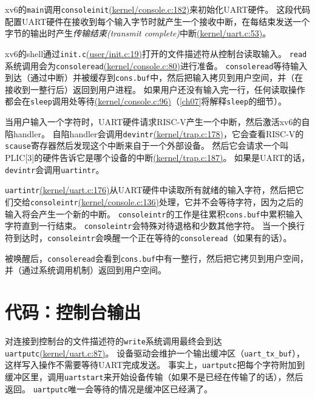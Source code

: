 xv6的\texttt{main}调用\texttt{consoleinit}\href{https://github.com/mit-pdos/xv6-riscv/blob/risc/kernel/console.c#L182}{(kernel/console.c:182)}来初始化UART硬件。
这段代码配置UART硬件在接收到每个输入字节时就产生一个接收中断，在每结束发送一个字节的输出时产生\emph{传输结束(transmit complete)}中断\href{https://github.com/mit-pdos/xv6-riscv/blob/risc/kernel/uart.c#L53}{(kernel/uart.c:53)}。

xv6的shell通过\texttt{init.c}\href{https://github.com/mit-pdos/xv6-riscv/blob/risc/user/init.c#L19}{(user/init.c:19)}打开的文件描述符从控制台读取输入。
\texttt{read}系统调用会为\texttt{consoleread}\href{https://github.com/mit-pdos/xv6-riscv/blob/risc/kernel/console.c#L80}{(kernel/console.c:80)}进行准备。
\texttt{consoleread}等待输入到达（通过中断）并被缓存到\texttt{cons.buf}中，然后把输入拷贝到用户空间，并（在接收到一整行后）返回到用户进程。
如果用户还没有输入完一行，任何读取操作都会在\texttt{sleep}调用处等待\href{https://github.com/mit-pdos/xv6-riscv/blob/risc/kernel/console.c#L96}{(kernel/console.c:96)}（\autoref{ch07}将解释\texttt{sleep}的细节）。

当用户输入一个字符时，UART硬件请求RISC-V产生一个中断，然后激活xv6的自陷handler。
自陷handler会调用\texttt{devintr}\href{https://github.com/mit-pdos/xv6-riscv/blob/risc/kernel/trap.c#L178}{(kernel/trap.c:178)}，它会查看RISC-V的\texttt{scause}寄存器然后发现这个中断来自于一个外部设备。
然后它会请求一个叫PLIC[3]的硬件告诉它是哪个设备的中断\href{https://github.com/mit-pdos/xv6-riscv/blob/risc/kernel/trap.c#L187}{(kernel/trap.c:187)}。
如果是UART的话，\texttt{devintr}会调用\texttt{uartintr}。

\texttt{uartintr}\href{https://github.com/mit-pdos/xv6-riscv/blob/risc/kernel/uart.c#L176}{(kernel/uart.c:176)}从UART硬件中读取所有就绪的输入字符，然后把它们交给\texttt{consoleintr}\href{https://github.com/mit-pdos/xv6-riscv/blob/risc/kernel/console.c#L136}{(kernel/console.c:136)}处理，它并不会等待字符，因为之后的输入将会产生一个新的中断。
\texttt{consoleintr}的工作是往累积\texttt{cons.buf}中累积输入字符直到一行结束。
\texttt{consoleintr}会特殊对待退格和少数其他字符。
当一个换行符到达时，\texttt{consoleintr}会唤醒一个正在等待的\texttt{consoleread}（如果有的话）。

被唤醒后，\texttt{consoleread}会看到\texttt{cons.buf}中有一整行，然后把它拷贝到用户空间，并（通过系统调用机制）返回到用户空间。

\section{代码：控制台输出}
对连接到控制台的文件描述符的\texttt{write}系统调用最终会到达\texttt{uartputc}\href{https://github.com/mit-pdos/xv6-riscv/blob/riscv//kernel/uart.c#L87}{(kernel/uart.c:87)}。
设备驱动会维护一个输出缓冲区（\texttt{uart\_tx\_buf}），这样写入操作不需要等待UART完成发送。
事实上，\texttt{uartputc}把每个字符附加到缓冲区里，调用\texttt{uartstart}来开始设备传输（如果不是已经在传输了的话），然后返回。
\texttt{uartputc}唯一会等待的情况是缓冲区已经满了。

